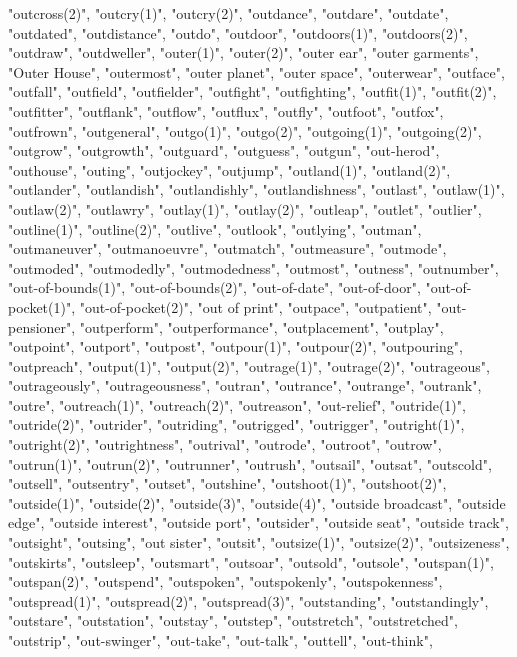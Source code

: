 "outcross(2)",
"outcry(1)",
"outcry(2)",
"outdance",
"outdare",
"outdate",
"outdated",
"outdistance",
"outdo",
"outdoor",
"outdoors(1)",
"outdoors(2)",
"outdraw",
"outdweller",
"outer(1)",
"outer(2)",
"outer ear",
"outer garments",
"Outer House",
"outermost",
"outer planet",
"outer space",
"outerwear",
"outface",
"outfall",
"outfield",
"outfielder",
"outfight",
"outfighting",
"outfit(1)",
"outfit(2)",
"outfitter",
"outflank",
"outflow",
"outflux",
"outfly",
"outfoot",
"outfox",
"outfrown",
"outgeneral",
"outgo(1)",
"outgo(2)",
"outgoing(1)",
"outgoing(2)",
"outgrow",
"outgrowth",
"outguard",
"outguess",
"outgun",
"out-herod",
"outhouse",
"outing",
"outjockey",
"outjump",
"outland(1)",
"outland(2)",
"outlander",
"outlandish",
"outlandishly",
"outlandishness",
"outlast",
"outlaw(1)",
"outlaw(2)",
"outlawry",
"outlay(1)",
"outlay(2)",
"outleap",
"outlet",
"outlier",
"outline(1)",
"outline(2)",
"outlive",
"outlook",
"outlying",
"outman",
"outmaneuver",
"outmanoeuvre",
"outmatch",
"outmeasure",
"outmode",
"outmoded",
"outmodedly",
"outmodedness",
"outmost",
"outness",
"outnumber",
"out-of-bounds(1)",
"out-of-bounds(2)",
"out-of-date",
"out-of-door",
"out-of-pocket(1)",
"out-of-pocket(2)",
"out of print",
"outpace",
"outpatient",
"out-pensioner",
"outperform",
"outperformance",
"outplacement",
"outplay",
"outpoint",
"outport",
"outpost",
"outpour(1)",
"outpour(2)",
"outpouring",
"outpreach",
"output(1)",
"output(2)",
"outrage(1)",
"outrage(2)",
"outrageous",
"outrageously",
"outrageousness",
"outran",
"outrance",
"outrange",
"outrank",
"outre",
"outreach(1)",
"outreach(2)",
"outreason",
"out-relief",
"outride(1)",
"outride(2)",
"outrider",
"outriding",
"outrigged",
"outrigger",
"outright(1)",
"outright(2)",
"outrightness",
"outrival",
"outrode",
"outroot",
"outrow",
"outrun(1)",
"outrun(2)",
"outrunner",
"outrush",
"outsail",
"outsat",
"outscold",
"outsell",
"outsentry",
"outset",
"outshine",
"outshoot(1)",
"outshoot(2)",
"outside(1)",
"outside(2)",
"outside(3)",
"outside(4)",
"outside broadcast",
"outside edge",
"outside interest",
"outside port",
"outsider",
"outside seat",
"outside track",
"outsight",
"outsing",
"out sister",
"outsit",
"outsize(1)",
"outsize(2)",
"outsizeness",
"outskirts",
"outsleep",
"outsmart",
"outsoar",
"outsold",
"outsole",
"outspan(1)",
"outspan(2)",
"outspend",
"outspoken",
"outspokenly",
"outspokenness",
"outspread(1)",
"outspread(2)",
"outspread(3)",
"outstanding",
"outstandingly",
"outstare",
"outstation",
"outstay",
"outstep",
"outstretch",
"outstretched",
"outstrip",
"out-swinger",
"out-take",
"out-talk",
"outtell",
"out-think",
